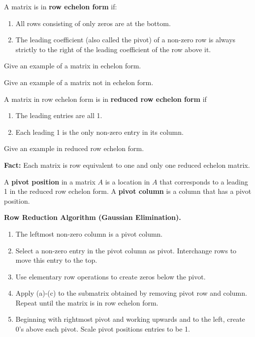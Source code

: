 \documentclass[12pt,letterpaper]{article}
\begin{document}
\newpage

\begin{defn}
A matrix is in {\bf row echelon form} if:
\begin{enumerate}
\item All rows consisting of only zeros are at the bottom.
\item The leading coefficient (also called the pivot) of a non-zero row is always strictly to the right of the leading coefficient of the row above it.
\end{enumerate}
\end{defn}

\begin{enumerate}
  \Problem 
  \Part Give an example of a matrix in echelon form.
  
  \vfill
  
  \Part Give an example of a matrix not in echelon form.

\vfill

\begin{defn}
A matrix in row echelon form is in {\bf reduced row echelon form} if 
\begin{enumerate}
\item The leading entries are all 1.
\item Each leading 1 is the only non-zero entry in its column.
\end{enumerate}
\end{defn}

\Part Give an example in reduced row echelon form.

\vfill

\newpage

{\bf Fact:} Each matrix is row equivalent to one and only one reduced echelon matrix.

\begin{defn}
A {\bf pivot position} in a matrix $A$ is a location in $A$ that corresponds to a leading 1 in the reduced row echelon form. A {\bf pivot column} is a column that has a pivot position. 
\end{defn}

{\bf Row Reduction Algorithm (Gaussian Elimination).}
\begin{enumerate}
\item The leftmost non-zero column is a pivot column.
\item Select a non-zero entry in the pivot column as pivot. Interchange rows to move this entry to the top.
\item Use elementary row operations to create zeros below the pivot.
\item Apply (a)-(c) to the submatrix obtained by removing pivot row and column. %
Repeat until the matrix is in row echelon form.
\item Beginning with rightmost pivot and working upwards and to the left, create 0's above each pivot. Scale pivot positions entries to be 1.
\end{enumerate}


\end{enumerate}
\end{document}
